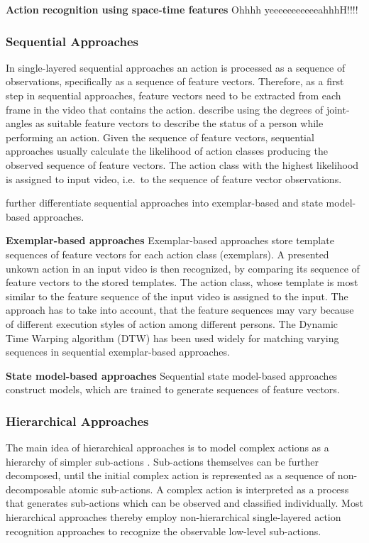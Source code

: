 \textbf{Action recognition using space-time features}
Ohhhh yeeeeeeeeeeeahhhH!!!!

\subsubsection{Sequential Approaches}
In single-layered sequential approaches an action is processed as a sequence of observations, specifically as a sequence of feature vectors.
Therefore, as a first step in sequential approaches, feature vectors need to be extracted from each frame in the video that contains the action.
\textcite{aggarwal_human_2011} describe using the degrees of joint-angles as suitable feature vectors to describe the status of a person while performing an action.
Given the sequence of feature vectors, sequential approaches usually calculate the likelihood of action classes producing the observed sequence of feature vectors.
The action class with the highest likelihood is assigned to input video, i.e.\ to the sequence of feature vector observations.

\textcite{aggarwal_human_2011} further differentiate sequential approaches into exemplar-based and state model-based approaches.

\textbf{Exemplar-based approaches}
Exemplar-based approaches store template sequences of feature vectors for each action class (exemplars).
A presented unkown action in an input video is then recognized, by comparing its sequence of feature vectors to the stored templates.
The action class, whose template is most similar to the feature sequence of the input video is assigned to the input.
The approach has to take into account, that the feature sequences may vary because of different execution styles of action among different persons.
The Dynamic Time Warping algorithm (DTW) has been used widely for matching varying sequences in sequential exemplar-based approaches\cite{darrell_space-time_1993}\cite{gavrila_towards_1995}\cite{veeraraghavan_function_2006}.

\textbf{State model-based approaches}
Sequential state model-based approaches construct models, which are trained to generate sequences of feature vectors.



\subsubsection{Hierarchical Approaches}
The main idea of hierarchical approaches is to model complex actions as a hierarchy of simpler sub-actions \cite{aggarwal_human_2011}.
Sub-actions themselves can be further decomposed, until the initial complex action is represented as a sequence of non-decomposable atomic sub-actions.
A complex action is interpreted as a process that generates sub-actions which can be observed and classified individually.
Most hierarchical approaches thereby employ non-hierarchical single-layered action recognition approaches to recognize the observable low-level sub-actions.

